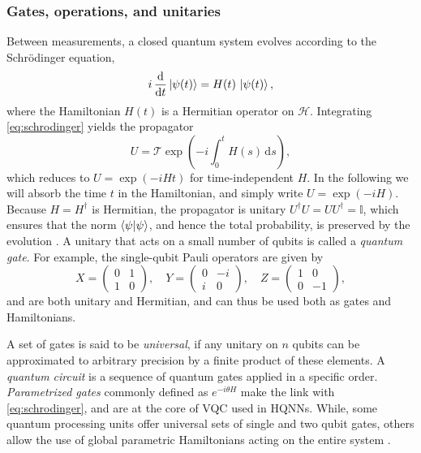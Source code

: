 \documentclass[aps,10pt,groupedaddress,prx,superscriptaddress,twocolumn,balancelastpage, tightenlines]{revtex4-2}
\theoremstyle{plain}  %
\begin{document}
\subsubsection{Gates, operations, and unitaries}
        \label{subsubsec:gates-unitaries}

Between measurements, a closed quantum system evolves according to the Schr\"odinger equation,
\begin{equation}
    i \, \frac{\mathrm{d}}{\mathrm{d}t} \ket{\psi(t)} = H(t)\, \ket{\psi(t)},
    \label{eq:schrodinger}
\end{equation}
where the Hamiltonian $H(t)$ is a Hermitian operator on $\mathcal{H}$. Integrating \autoref{eq:schrodinger} yields the propagator
\begin{equation}
    U = \mathcal{T}\exp\!\left(- i\int_0^t H(s)\,\mathrm{d}s\right),
\end{equation}
which reduces to $U= \exp(-iHt)$ for time-independent $H$. In the following we will absorb the time $t$ in the Hamiltonian, and simply write $U= \exp(-iH)$.  Because $H = H^{\dagger}$ is Hermitian, the propagator is unitary $U^{\dagger}U = U U^{\dagger} = \mathbb{I}$, which ensures that the norm $\braket{\psi}{\psi}$, and hence the total probability, is preserved by the evolution \cite{Nielsen2011Quantum,dewolf2023quantumcomputinglecturenotes}. A unitary that acts on a small number of qubits is called a \emph{quantum gate}. For example, the single-qubit Pauli operators are given by
\begin{equation}\label{eq: pauli}
    X = \begin{pmatrix} 0 & 1 \\ 1 & 0 \end{pmatrix}, \quad
    Y = \begin{pmatrix} 0 & -i \\ i & 0 \end{pmatrix}, \quad
    Z = \begin{pmatrix} 1 & 0 \\ 0 & -1 \end{pmatrix},
\end{equation}
and are both unitary and Hermitian, and can thus be used both as gates and Hamiltonians.


A set of gates is said to be \emph{universal}, if any unitary on $n$ qubits can be approximated to arbitrary precision by a finite product of these elements. A \emph{quantum circuit} is a sequence of quantum gates applied in a specific order. \emph{Parametrized gates} commonly defined as $e^{-i\theta H}$ make the link with \autoref{eq:schrodinger}, and are at the core of \gls{VQC} used in HQNNs. While, some quantum processing units offer universal sets of single and two qubit gates, others allow the use of global parametric Hamiltonians acting on the entire system \cite{bluvstein_fault-tolerant_2026}.
\end{document}
